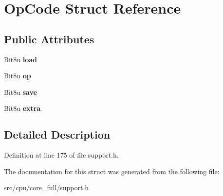 \hypertarget{structOpCode}{\section{Op\-Code Struct Reference}
\label{structOpCode}
}
\subsection*{Public Attributes}
\begin{DoxyCompactItemize}
\item 
\hypertarget{structOpCode_a2a15f0dec79883cdebf4f5eb78ca5a15}{Bit8u {\bfseries load}}\label{structOpCode_a2a15f0dec79883cdebf4f5eb78ca5a15}

\item 
\hypertarget{structOpCode_a19e02ccfa033e6c6e7ccb67dd22517ef}{Bit8u {\bfseries op}}\label{structOpCode_a19e02ccfa033e6c6e7ccb67dd22517ef}

\item 
\hypertarget{structOpCode_af3430bdc0151ab95a10e9fa221256284}{Bit8u {\bfseries save}}\label{structOpCode_af3430bdc0151ab95a10e9fa221256284}

\item 
\hypertarget{structOpCode_ad626ad5c7c0e628d008384e6ab871d36}{Bit8u {\bfseries extra}}\label{structOpCode_ad626ad5c7c0e628d008384e6ab871d36}

\end{DoxyCompactItemize}


\subsection{Detailed Description}


Definition at line 175 of file support.\-h.



The documentation for this struct was generated from the following file\-:\begin{DoxyCompactItemize}
\item 
src/cpu/core\-\_\-full/support.\-h\end{DoxyCompactItemize}
